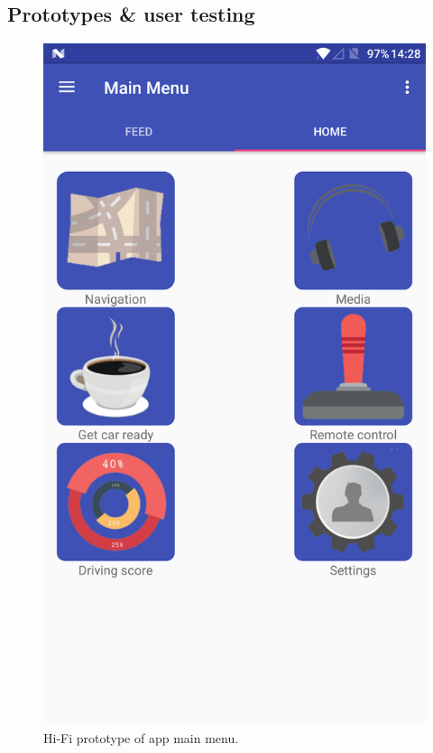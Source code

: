 \documentclass{article}
\begin{document}
\subsection{Prototypes \& user testing}\label{ssec:app-prototypes-testing}
\begin{figure}[H]
  \centering
  \includegraphics[scale=0.25]{main-menu}
  \caption{Hi-Fi prototype of app main menu.}\label{main-menu}
\end{figure}
\end{document}
